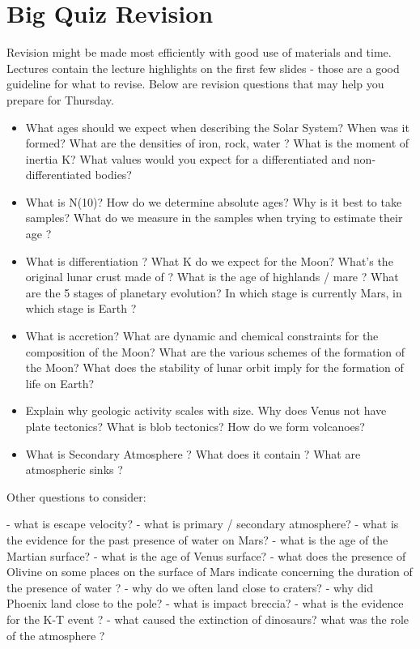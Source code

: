 \documentclass[paper=a4, fontsize=11pt]{scrartcl} %
\numberwithin{equation}{section} %
\begin{document}

\section{Big Quiz  Revision  }

Revision might be made most efficiently with good use of materials and time. Lectures contain the lecture highlights on the first few slides - those are a good guideline for what to revise.  Below are revision questions that may help you prepare for Thursday.

\begin{itemize}
\item What ages should we expect when describing the Solar System? When was it formed? What are the densities of iron, rock, water ? What is the moment of inertia K? What values would you expect for a differentiated and non-differentiated bodies? 
\item What is N(10)?   How do we determine absolute ages? Why is it best to take samples? What do we measure in the samples when trying to estimate their age ? 
\item What is differentiation ?  What K do we expect for the Moon?  What's the original lunar crust made of ? What is the age of highlands  / mare ? What are the 5 stages of planetary evolution? In which stage is currently Mars, in which stage is Earth ?  
\item  What is accretion? What are dynamic and chemical constraints for the composition of the Moon? What are the various schemes of the formation of the Moon? What does the stability of lunar orbit imply for the formation of life on Earth?  
\item Explain why geologic activity scales with size. Why does Venus not have plate tectonics? What is blob tectonics? How do we form volcanoes? 

\item What is Secondary Atmosphere ? What does it contain ? What are atmospheric sinks ? 

\end{itemize}

Other questions to consider:

- what is escape velocity?  
- what is primary  / secondary atmosphere? 
- what is the evidence for the past presence of water on Mars? 
- what is the age of the Martian surface?
- what is the age of Venus surface? 
- what does the presence of Olivine on some places on the surface of Mars indicate concerning the duration of the presence of water ?  
- why do we often  land close to craters?
- why did Phoenix land close to the pole? 
-  what is impact breccia?
- what is the evidence for the K-T event ? 
- what caused the extinction of dinosaurs? what was the role of the atmosphere ? 
\end{document}

